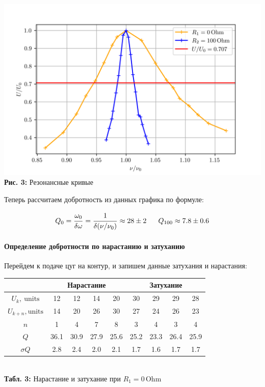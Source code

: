 \documentclass[12pt,a4paper]{scrartcl}
\begin{document}
	\begin{center}
		\includegraphics[scale=1]{PIC_3.png}
		\\\textbf{Рис. 3:} Резонансные кривые
	\end{center}

	Теперь рассчитаем добротность из данных графика по формуле:
	
	$$Q_{0} = \dfrac{\strut \omega_0}{\strut \delta{\omega}} = \dfrac{\strut 1}{\strut \delta(\nu / \nu_0)} \approx 28 \pm 2\ \ \ \ \ Q_{100} \approx 7.8 \pm 0.6$$
	
	\paragraph{Определение добротности по нарастанию и затуханию} \hfill
	
	Перейдем к подаче цуг на контур, и запишем данные затухания и нарастания:
	
	\begin{center}
		\begin{tabular}{|c|c|c|c|c|c|c|c|c|}  \hline
			{} & \multicolumn{4}{|c|}{Нарастание} & \multicolumn{4}{|c|}{Затухание} \\\hline
			$U_k,\ \text{units}$ & 12 & 12 & 14 & 20 & 30 & 29 & 29 & 28 \\\hline
			$U_{k+n}, \text{units}$ & 14 & 20 & 26 & 30 & 27 & 24 & 26 & 23 \\\hline
			$n$ & 1 & 4 & 7 & 8 & 3 & 4 & 3 & 4 \\\hline
			$Q$ & 36.1 & 30.9 & 27.9 & 25.6 & 25.2 & 23.3 & 26.4 & 25.9 \\\hline
			$\sigma Q$ & 2.8 & 2.4 & 2.0 & 2.1 & 1.7 & 1.6 & 1.7 & 1.7 \\\hline
		\end{tabular}
		\\\textbf{Табл. 3:} Нарастание и затухание при $R_1 = 0\, \mathrm{Ohm}$
	\end{center}
	
\end{document}
